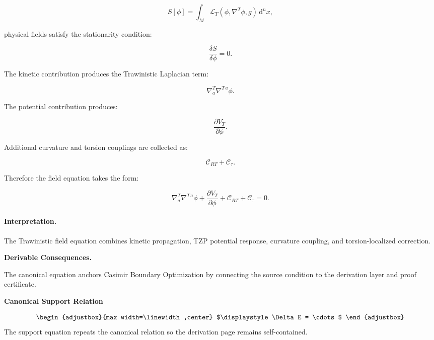 \begin{equation}
S[\phi]
=
\int_M
\mathcal{L}_T
\left(
\phi,\nabla^T\phi,g
\right)
\,\mathrm{d}^n x ,
\end{equation}

physical fields satisfy the stationarity condition:

\begin{equation}
\frac{\delta S}{\delta\phi}=0 .
\end{equation}

The kinetic contribution produces the Trawinistic Laplacian term:

\begin{equation}
\nabla^T_a\nabla^{T\,a}\phi .
\end{equation}

The potential contribution produces:

\begin{equation}
\frac{\partial V_T}{\partial \phi}.
\end{equation}

Additional curvature and torsion couplings are collected as:

\begin{equation}
\mathcal{C}_{RT}
+
\mathcal{C}_{\tau}.
\end{equation}

Therefore the field equation takes the form:

\begin{equation}
\boxed{
\nabla^T_a\nabla^{T\,a}\phi
+
\frac{\partial V_T}{\partial \phi}
+
\mathcal{C}_{RT}
+
\mathcal{C}_{\tau}
=
0 .
}
\end{equation}

\paragraph{Interpretation.}
The Trawinistic field equation combines kinetic propagation, TZP potential response, curvature coupling, and torsion-localized correction.

\par\vspace{0.35em}
\noindent\textbf{Derivable Consequences.}\quad
\begingroup
\footnotesize
\raggedright
The canonical equation anchors Casimir Boundary Optimization by connecting the source condition to the derivation layer and proof certificate.
\par\endgroup

\noindent\textbf{Canonical Support Relation}\par
\[
\begin{adjustbox}{max width=\linewidth,center}
$\displaystyle
\Delta E = \cdots
$
\end{adjustbox}
\]
\noindent The support equation repeats the canonical relation so the derivation page remains self-contained.\par


